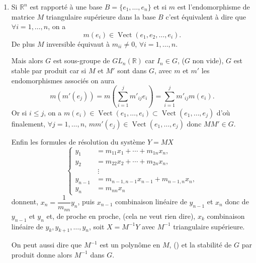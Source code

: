 \begin{enumerate}[label=\arabic*.,leftmargin=2.2em,itemsep=1.2em]
Enfin card$(Z)=1$ est absurde, car si $G$ opère sur lui-même par automorphismes intérieurs, soit pour $g\in G$,
\[
O_g=\{xgx^{-1};\ x\in G\}
\]
l'orbite de $g$. On a
\[
\operatorname{card}(O_g)=1
\Longleftrightarrow \forall x\in G,\ xgx^{-1}=g
\Longleftrightarrow \forall x\in G,\ xg=gx
\Longleftrightarrow g\in Z
\Longleftrightarrow g=e.
\]
Comme avec $\Gamma_g$ groupe d'isotropie de $g$ on a
\[
\operatorname{card}(G)=\operatorname{card}(\Gamma_g)\times\operatorname{card}(O_g),
\qquad\text{pour }g\ne e,
\]
card$(O_g)$ est un diviseur différent de 1 de $p^2$, c'est $p$ ou $p^2$. L'équation aux classes donne $p^2=1+$ multiple de $p$ : absurde. On a bien $G$ abélien.

\item Si $\mathbb R^n$ est rapporté à une base $B=\{e_1,\ldots,e_n\}$ et si $m$ est l'endomorphisme de matrice $M$ triangulaire supérieure dans la base $B$ c'est équivalent à dire que $\forall i=1,\ldots,n$, on a
\[
m(e_i)\in\operatorname{Vect}(e_1,e_2,\ldots,e_i).
\]
De plus $M$ inversible équivaut à $m_{ii}\ne0$, $\forall i=1,\ldots,n$.

Mais alors $G$ est sous-groupe de $GL_n(\mathbb R)$ car $I_n\in G$, ($G$ non vide), $G$ est stable par produit car si $M$ et $M'$ sont dans $G$, avec $m$ et $m'$ les endomorphismes associés on aura
\[
m(m'(e_j))=m\left(\sum_{i=1}^{j}m'_{ij}e_i\right)
=\sum_{i=1}^{j}m'_{ij}m(e_i).
\]
Or si $i\le j$, on a $m(e_i)\in\operatorname{Vect}(e_1,\ldots,e_i)\subset\operatorname{Vect}(e_1,\ldots,e_j)$ d'où finalement, $\forall j=1,\ldots,n$, $mm'(e_j)\in\operatorname{Vect}(e_1,\ldots,e_j)$ donc $MM'\in G$.

Enfin les formules de résolution du système $Y=MX$
\[
\left\{
\begin{aligned}
y_1&=m_{11}x_1+\cdots+m_{1n}x_n,\\
y_2&=m_{22}x_2+\cdots+m_{2n}x_n,\\
&\ \vdots\\
y_{n-1}&=m_{n-1,n-1}x_{n-1}+m_{n-1,n}x_n,\\
y_n&=m_{nn}x_n
\end{aligned}
\right.
\]
donnent, $x_n=\dfrac1{m_{nn}}y_n$, puis $x_{n-1}$ combinaison linéaire de $y_{n-1}$ et $x_n$ donc de $y_{n-1}$ et $y_n$ et, de proche en proche, (cela ne veut rien dire), $x_k$ combinaison linéaire de $y_k,y_{k+1},\ldots,y_n$, soit $X=M^{-1}Y$ avec $M^{-1}$ triangulaire supérieure.

On peut aussi dire que $M^{-1}$ est un polynôme en $M$, () et la stabilité de $G$ par produit donne alors $M^{-1}$ dans $G$.


\end{enumerate}
